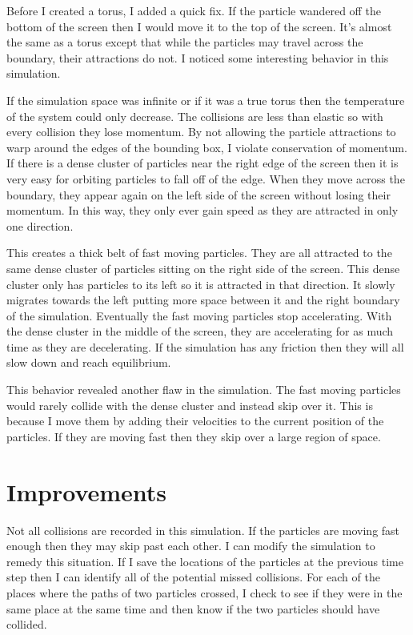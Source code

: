 \documentclass[12pt]{article}
\begin{document}
Before I created a torus, I added a quick fix. If the particle wandered off the bottom of the screen then I would move it to the top of the screen. It's almost the same as a torus except that while the particles may travel across the boundary, their attractions do not. I noticed some interesting behavior in this simulation.

If the simulation space was infinite or if it was a true torus then the temperature of the system could only decrease. The collisions are less than elastic so with every collision they lose momentum. By not allowing the particle attractions to warp around the edges of the bounding box, I violate conservation of momentum. If there is a dense cluster of particles near the right edge of the screen then it is very easy for orbiting particles to fall off of the edge. When they move across the boundary, they appear again on the left side of the screen without losing their momentum. In this way, they only ever gain speed as they are attracted in only one direction.

This creates a thick belt of fast moving particles. They are all attracted to the same dense cluster of particles sitting on the right side of the screen. This dense cluster only has particles to its left so it is attracted in that direction. It slowly migrates towards the left putting more space between it and the right boundary of the simulation. Eventually the fast moving particles stop accelerating. With the dense cluster in the middle of the screen, they are accelerating for as much time as they are decelerating. If the simulation has any friction then they will all slow down and reach equilibrium.

This behavior revealed another flaw in the simulation. The fast moving particles would rarely collide with the dense cluster and instead skip over it. This is because I move them by adding their velocities to the current position of the particles. If they are moving fast then they skip over a large region of space.
\section{Improvements}
Not all collisions are recorded in this simulation. If the particles are moving fast enough then they may skip past each other. I can modify the simulation to remedy this situation. If I save the locations of the particles at the previous time step then I can identify all of the potential missed collisions. For each of the places where the paths of two particles crossed, I check to see if they were in the same place at the same time and then know if the two particles should have collided.
\end{document}
